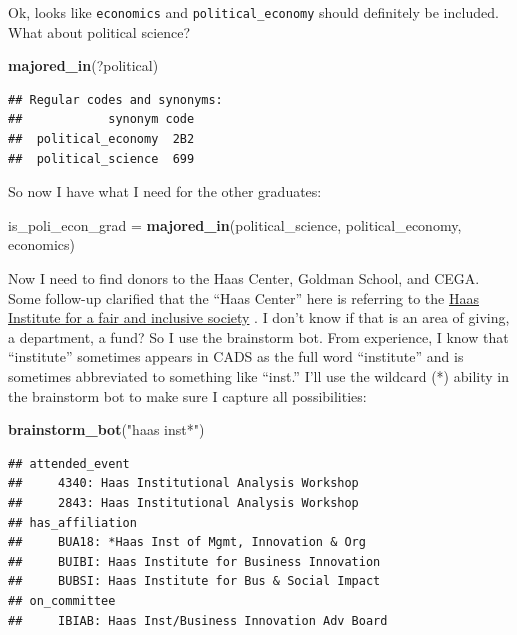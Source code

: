 \documentclass[]{book}
\newenvironment{Shaded}{\begin{snugshade}}{\end{snugshade}}
\newcommand{\KeywordTok}[1]{\textcolor[rgb]{0.13,0.29,0.53}{\textbf{#1}}}
\newcommand{\NormalTok}[1]{#1}
\newcommand{\StringTok}[1]{\textcolor[rgb]{0.31,0.60,0.02}{#1}}
\begin{document}
Ok, looks like \texttt{economics} and \texttt{political\_economy} should definitely be included. What about political science?

\begin{Shaded}
\begin{Highlighting}[]
\KeywordTok{majored_in}\NormalTok{(?political)}
\end{Highlighting}
\end{Shaded}

\begin{verbatim}
## Regular codes and synonyms:
##            synonym code
##  political_economy  2B2
##  political_science  699
\end{verbatim}

So now I have what I need for the other graduates:

\begin{Shaded}
\begin{Highlighting}[]
\NormalTok{is_poli_econ_grad =}\StringTok{ }\KeywordTok{majored_in}\NormalTok{(political_science, political_economy, economics)}
\end{Highlighting}
\end{Shaded}

Now I need to find donors to the Haas Center, Goldman School, and CEGA. Some follow-up clarified that the ``Haas Center'' here is referring to the \href{http://haasinstitute.berkeley.edu/}{Haas Institute for a fair and inclusive society} . I don't know if that is an area of giving, a department, a fund? So I use the brainstorm bot. From experience, I know that ``institute'' sometimes appears in CADS as the full word ``institute'' and is sometimes abbreviated to something like ``inst.'' I'll use the wildcard (*) ability in the brainstorm bot to make sure I capture all possibilities:

\begin{Shaded}
\begin{Highlighting}[]
\KeywordTok{brainstorm_bot}\NormalTok{(}\StringTok{"haas inst*"}\NormalTok{)}
\end{Highlighting}
\end{Shaded}

\begin{verbatim}
## attended_event 
##     4340: Haas Institutional Analysis Workshop
##     2843: Haas Institutional Analysis Workshop
## has_affiliation 
##     BUA18: *Haas Inst of Mgmt, Innovation & Org
##     BUIBI: Haas Institute for Business Innovation
##     BUBSI: Haas Institute for Bus & Social Impact
## on_committee 
##     IBIAB: Haas Inst/Business Innovation Adv Board
\end{verbatim}
\end{document}
